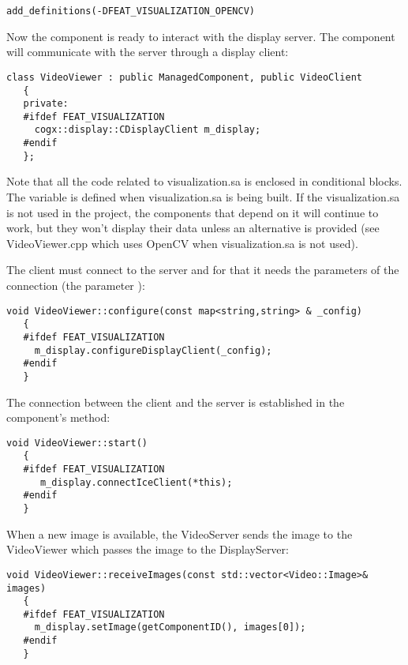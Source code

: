 \begin{Verbatim}[fontsize=\scriptsize,gobble=3]
   add_definitions(-DFEAT_VISUALIZATION_OPENCV)
\end{Verbatim}

Now the component is ready to interact with the display server. The component
will communicate with the server through a display client:

\begin{Verbatim}[fontsize=\scriptsize,gobble=3]
   class VideoViewer : public ManagedComponent, public VideoClient
   {
   private:
   #ifdef FEAT_VISUALIZATION
     cogx::display::CDisplayClient m_display;
   #endif
   };
\end{Verbatim}

Note that all the code related to visualization.sa is enclosed in conditional
blocks. The variable  is defined when
visualization.sa is being built. If the visualization.sa is not used in the
project, the components that depend on it will continue to work, but they won't
display their data unless an alternative is provided (see VideoViewer.cpp which
uses OpenCV when visualization.sa is not used).

The client must connect to the server and for that it needs the parameters of the
connection (the parameter ):

\begin{Verbatim}[fontsize=\scriptsize,gobble=3]
   void VideoViewer::configure(const map<string,string> & _config)
   {
   #ifdef FEAT_VISUALIZATION
     m_display.configureDisplayClient(_config);
   #endif
   }
\end{Verbatim}

The connection between the client and the server is established in the component's
 method:
\begin{Verbatim}[fontsize=\scriptsize,gobble=3]
   void VideoViewer::start()
   {
   #ifdef FEAT_VISUALIZATION
      m_display.connectIceClient(*this);
   #endif
   }
\end{Verbatim}

When a new image is available, the VideoServer sends the image to the VideoViewer which
passes the image to the DisplayServer:

\begin{Verbatim}[fontsize=\scriptsize,gobble=3]
   void VideoViewer::receiveImages(const std::vector<Video::Image>& images)
   {
   #ifdef FEAT_VISUALIZATION
     m_display.setImage(getComponentID(), images[0]);
   #endif
   }
\end{Verbatim}


